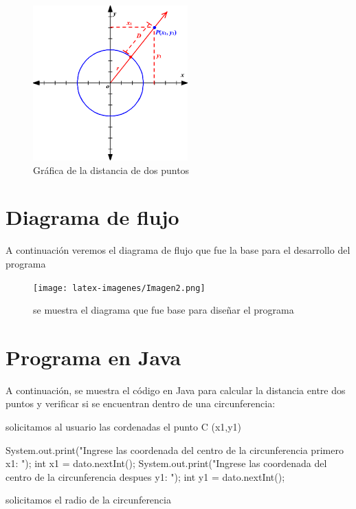 \documentclass{IEEEcsmag}
\begin{document}
\begin{figure}[h!]
    \centering
    \includegraphics[width = 6 cm]{latex-imagenes/imagen7.png}
    \caption{Gráfica de la distancia de dos puntos}
    \label{fig:Grafica de la distancia de dos puntos }
\end{figure}
\section{Diagrama de flujo}
A continuación veremos el diagrama de flujo que fue la base para el desarrollo del programa
\begin{figure}[h!]
    \centering
    \texttt{[image: latex-imagenes/Imagen2.png]}
    \caption{se muestra el diagrama que fue base para diseñar el programa}
    \label{fig:diagrama de flujo}
\end{figure}
\section{Programa en Java}
A continuación, se muestra el código en Java para calcular la distancia entre dos puntos y verificar si se encuentran dentro de una circunferencia:


   \begin{javaCode}
       
    public static void main(String[] args) {
        
         Scanner dato = new Scanner(System.in);
        \end{javaCode}
        solicitamos al usuario las cordenadas el punto C (x1,y1)
       \begin{javaCode}
        System.out.print("Ingrese las coordenada del centro de la circunferencia primero x1: ");
        int x1 = dato.nextInt();
        System.out.print("Ingrese las coordenada del centro de la circunferencia despues y1: ");
        int y1 = dato.nextInt();
         \end{javaCode}
         solicitamos el radio de la circunferencia
       
\end{document}
